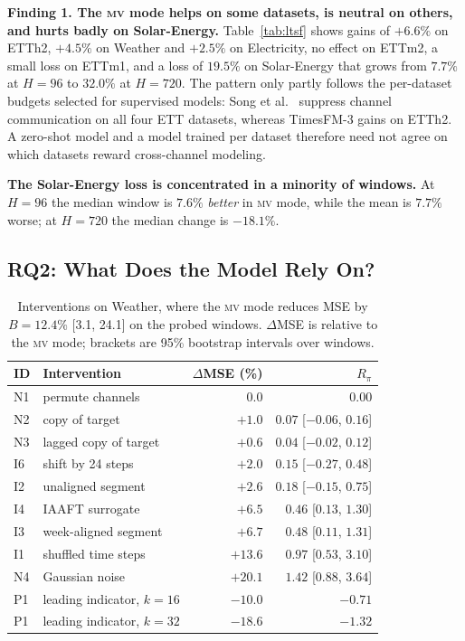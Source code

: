 \documentclass[runningheads]{llncs}
\newif\ifshowtodos
\newcommand{\todo}[1]{\ifshowtodos\textcolor{red}{[TODO: #1]}\fi}
\newcommand{\MV}{\textsc{mv}}
\newcommand{\Ben}{B}
\newcommand{\Rel}{R}
\newcommand{\tfm}{TimesFM-3}
\begin{document}
\noindent\textbf{Finding 1. The \MV{} mode helps on some datasets, is neutral
on others, and hurts badly on Solar-Energy.}
Table~\ref{tab:ltsf} shows gains of $+6.6\%$ on ETTh2, $+4.5\%$ on Weather and
$+2.5\%$ on Electricity, no effect on ETTm2, a small loss on ETTm1, and a loss
of $19.5\%$ on Solar-Energy that grows from $7.7\%$ at $H=96$ to $32.0\%$ at
$H=720$. The pattern only partly follows the per-dataset budgets selected for
supervised models: Song et al.~\cite{song2026cloc} suppress channel
communication on all four ETT datasets, whereas \tfm{} gains on ETTh2. A
zero-shot model and a model trained per dataset therefore need not agree on
which datasets reward cross-channel modeling.

\noindent\textbf{The Solar-Energy loss is concentrated in a minority of
windows.} At $H=96$ the median window is $7.6\%$ \emph{better} in \MV{} mode,
while the mean is $7.7\%$ worse; at $H=720$ the median change is $-18.1\%$.
\todo{Relate per-window losses to time of day and to the variance of the
context channels (night-time channels are constant at zero).}

\subsection{RQ2: What Does the Model Rely On?}\label{sec:rq2}

\begin{table}[t]
  \centering
  \caption{Interventions on Weather, where the \MV{} mode reduces MSE by
  $\Ben=12.4\%$ [3.1, 24.1] on the probed windows. $\Delta$MSE is relative to
  the \MV{} mode; brackets are 95\% bootstrap intervals over windows.}
  \label{tab:e2}
  \setlength{\tabcolsep}{5pt}
  \begin{tabular}{@{}llrr@{}}
    \toprule
    ID & Intervention & $\Delta$MSE (\%) & $\Rel_\pi$ \\
    \midrule
    N1 & permute channels         &   $0.0$ & $0.00$ \\
    N2 & copy of target           &  $+1.0$ & $0.07$ [$-0.06$, $0.16$] \\
    N3 & lagged copy of target    &  $+0.6$ & $0.04$ [$-0.02$, $0.12$] \\
    I6 & shift by 24 steps        &  $+2.0$ & $0.15$ [$-0.27$, $0.48$] \\
    I2 & unaligned segment        &  $+2.6$ & $0.18$ [$-0.15$, $0.75$] \\
    I4 & IAAFT surrogate          &  $+6.5$ & $0.46$ [$0.13$, $1.30$] \\
    I3 & week-aligned segment     &  $+6.7$ & $0.48$ [$0.11$, $1.31$] \\
    I1 & shuffled time steps      & $+13.6$ & $0.97$ [$0.53$, $3.10$] \\
    N4 & Gaussian noise           & $+20.1$ & $1.42$ [$0.88$, $3.64$] \\
    \midrule
    P1 & leading indicator, $k=16$ & $-10.0$ & $-0.71$ \\
    P1 & leading indicator, $k=32$ & $-18.6$ & $-1.32$ \\
    \bottomrule
  \end{tabular}
\end{table}
\end{document}
